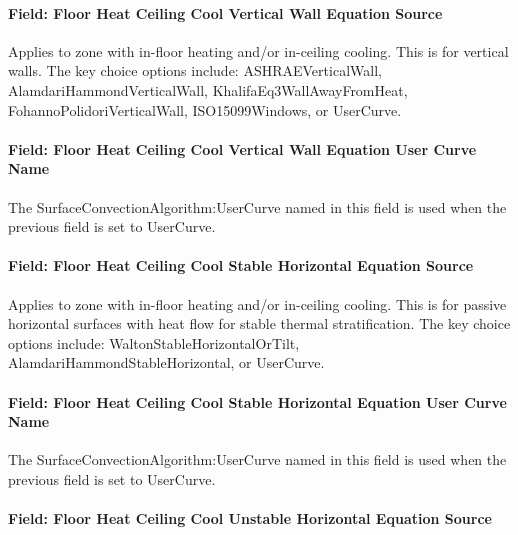 \paragraph{Field: Floor Heat Ceiling Cool Vertical Wall Equation Source}\label{field-floor-heat-ceiling-cool-vertical-wall-equation-source}

Applies to zone with in-floor heating and/or in-ceiling cooling. This is for vertical walls. The key choice options include: ASHRAEVerticalWall, AlamdariHammondVerticalWall, KhalifaEq3WallAwayFromHeat, FohannoPolidoriVerticalWall, ISO15099Windows, or UserCurve.

\paragraph{Field: Floor Heat Ceiling Cool Vertical Wall Equation User Curve Name}\label{field-floor-heat-ceiling-cool-vertical-wall-equation-user-curve-name}

The SurfaceConvectionAlgorithm:UserCurve named in this field is used when the previous field is set to UserCurve.

\paragraph{Field: Floor Heat Ceiling Cool Stable Horizontal Equation Source}\label{field-floor-heat-ceiling-cool-stable-horizontal-equation-source}

Applies to zone with in-floor heating and/or in-ceiling cooling. This is for passive horizontal surfaces with heat flow for stable thermal stratification. The key choice options include: WaltonStableHorizontalOrTilt, AlamdariHammondStableHorizontal, or UserCurve.

\paragraph{Field: Floor Heat Ceiling Cool Stable Horizontal Equation User Curve Name}\label{field-floor-heat-ceiling-cool-stable-horizontal-equation-user-curve-name}

The SurfaceConvectionAlgorithm:UserCurve named in this field is used when the previous field is set to UserCurve.

\paragraph{Field: Floor Heat Ceiling Cool Unstable Horizontal Equation Source}\label{field-floor-heat-ceiling-cool-unstable-horizontal-equation-source}

